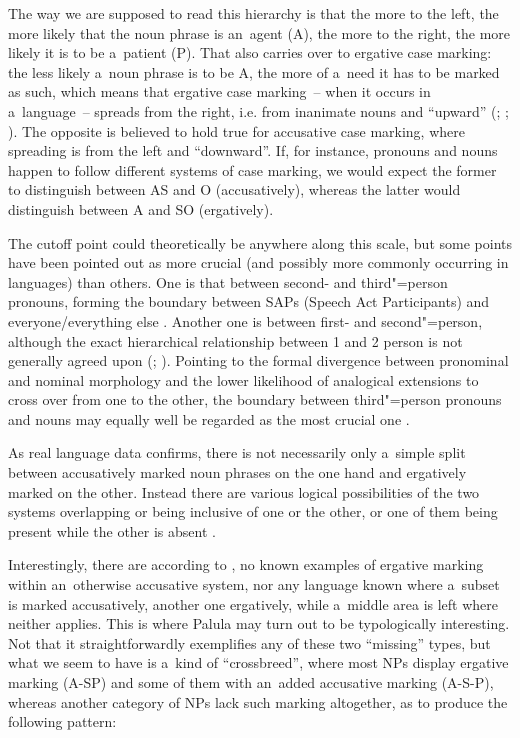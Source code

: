 The way we are supposed to read this hierarchy is that the more to the left, the more likely that the noun phrase is an~agent (A), the more to the right, the more likely it is to be a~patient (P). That also carries over to ergative case marking: the less likely a~noun phrase is to be A, the more of a~need it has to be marked as such, which means that ergative case marking~-- when it occurs in a~language~-- spreads from the right, i.e. from inanimate nouns and ``upward'' (\citealt[645]{delancey1981}; \citealt[84]{dixon1994}; \citealt[262]{garrett1990}). The opposite is believed to hold true for accusative case marking, where spreading is from the left and ``downward''. If, for instance, pronouns and nouns happen to follow different systems of case marking, we would expect the former to distinguish between AS and O (accusatively), whereas the latter would distinguish between A and SO (ergatively). 



The cutoff point could theoretically be anywhere along this scale, but some points have been pointed out as more crucial (and possibly more commonly occurring in languages) than others. One is that between second- and third"=person pronouns, forming the boundary between SAPs (Speech Act Participants) and everyone/everything else \citep[644]{delancey1981}. Another one is between first- and second"=person, although the exact hierarchical relationship between 1 and 2 person is not generally agreed upon (\citealt[644]{delancey1981}; \citealt[88--90]{dixon1994}). Pointing to the formal divergence between pronominal and nominal morphology and the lower likelihood of analogical extensions to cross over from one to the other, the boundary between third"=person pronouns and nouns may equally well be regarded as the most crucial one \citep[286]{garrett1990}. 



As real language data confirms, there is not necessarily only a~simple split between accusatively marked noun phrases on the one hand and ergatively marked on the other. Instead there are various logical possibilities of the two systems overlapping or being inclusive of one or the other, or one of them being present while the other is absent \citep[109]{dixon1994}.



Interestingly, there are according to \citeauthor{dixon1994}, no known examples of ergative marking within an~otherwise accusative system, nor any language known where a~subset is marked accusatively, another one ergatively, while a~middle area is left where neither applies. This is where Palula may turn out to be typologically interesting. Not that it straightforwardly exemplifies any of these two ``missing'' types, but what we seem to have is a~kind of ``crossbreed'', where most NPs display ergative marking (A-SP) and some of them with an~added accusative marking (A-S-P), whereas another category of NPs lack such marking altogether, as to produce the following pattern:


